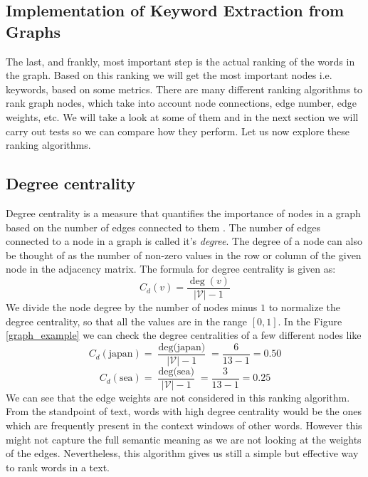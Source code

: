 \documentclass[12pt]{article}
\numberwithin{equation}{section}
\begin{document}
\begin{spacing}{1.5}
	\newpage
	\section{Implementation of Keyword Extraction from Graphs}
	The last, and frankly, most important step is the actual ranking of the words in the graph. Based on this ranking we will get the most important nodes i.e. keywords, based on some metrics. There are many different ranking algorithms to rank graph nodes, which take into account node connections, edge number, edge weights, etc. We will take a look at some of them and in the next section we will carry out tests so we can compare how they perform. Let us now explore these ranking algorithms.
	\subsection{Degree centrality}
	Degree centrality is a measure that quantifies the importance of nodes in a graph based on the number of edges connected to them \cite{networkx_centrality}. The number of edges connected to a node in a graph is called it's \textit{degree}. The degree of a node can also be thought of as the number of non-zero values in the row or column of the given node in the adjacency matrix. The formula for degree centrality is given as:
	\begin{equation}
		C_d(v) = \frac{\deg(v)}{|\mathcal{V}|-1}
	\end{equation}
	We divide the node degree by the number of nodes minus $1$ to normalize the degree centrality, so that all the values are in the range $[0, 1]$. In the Figure \ref{graph_example} we can check the degree centralities of a few different nodes like 
	$$C_d(\text{japan}) = \frac{\deg\text{(japan)}}{|\mathcal{V}|-1} = \frac{6}{13-1} = 0.50$$
	$$C_d(\text{sea}) = \frac{\deg\text{(sea)}}{|\mathcal{V}|-1} = \frac{3}{13-1} = 0.25$$
	We can see that the edge weights are not considered in this ranking algorithm. From the standpoint of text, words with high degree centrality would be the ones which are frequently present in the context windows of other words. However this might not capture the full semantic meaning as we are not looking at the weights of the edges. Nevertheless, this algorithm gives us still a simple but effective way to rank words in a text. 	
	

\end{spacing}
\end{document}
